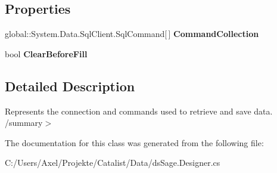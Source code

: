 \subsection*{Properties}
\begin{DoxyCompactItemize}
\item 
global\+::\+System.\+Data.\+Sql\+Client.\+Sql\+Command\mbox{[}$\,$\mbox{]} {\bfseries Command\+Collection}\hypertarget{class_products_1_1_data_1_1ds_sage_table_adapters_1_1ta_ups_shipping_a937c77452e20b0be00ebfa5912bb0e2c}{}\label{class_products_1_1_data_1_1ds_sage_table_adapters_1_1ta_ups_shipping_a937c77452e20b0be00ebfa5912bb0e2c}

\item 
bool {\bfseries Clear\+Before\+Fill}\hypertarget{class_products_1_1_data_1_1ds_sage_table_adapters_1_1ta_ups_shipping_a34bb4eed8448c60712ad869a375ffc7c}{}\label{class_products_1_1_data_1_1ds_sage_table_adapters_1_1ta_ups_shipping_a34bb4eed8448c60712ad869a375ffc7c}

\end{DoxyCompactItemize}


\subsection{Detailed Description}
Represents the connection and commands used to retrieve and save data. /summary$>$ 

The documentation for this class was generated from the following file\+:\begin{DoxyCompactItemize}
\item 
C\+:/\+Users/\+Axel/\+Projekte/\+Catalist/\+Data/ds\+Sage.\+Designer.\+cs\end{DoxyCompactItemize}
